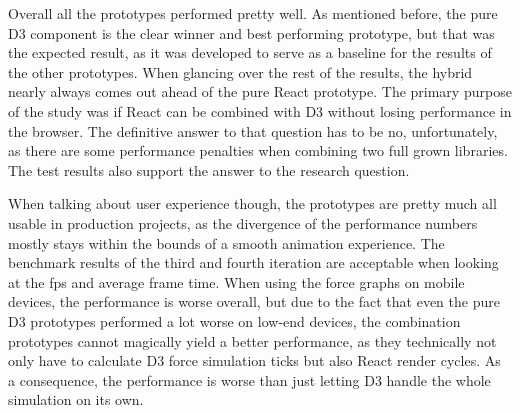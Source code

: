 Overall all the prototypes performed pretty well. As mentioned before, the pure D3 component is the clear winner and best performing prototype, but that was the expected result, as it was developed to serve as a baseline for the results of the other prototypes. When glancing over the rest of the results, the hybrid nearly always comes out ahead of the pure React prototype. The primary purpose of the study was if React can be combined with D3 without losing performance in the browser. The definitive answer to that question has to be no, unfortunately, as there are some performance penalties when combining two full grown libraries. The test results also support the answer to the research question.

When talking about user experience though, the prototypes are pretty much all usable in production projects, as the divergence of the performance numbers mostly stays within the bounds of a smooth animation experience. The benchmark results of the third and fourth iteration are acceptable when looking at the fps and average frame time. When using the force graphs on mobile devices, the performance is worse overall, but due to the fact that even the pure D3 prototypes performed a lot worse on low-end devices, the combination prototypes cannot magically yield a better performance, as they technically not only have to calculate D3 force simulation ticks but also React render cycles. As a consequence, the performance is worse than just letting D3 handle the whole simulation on its own. 

